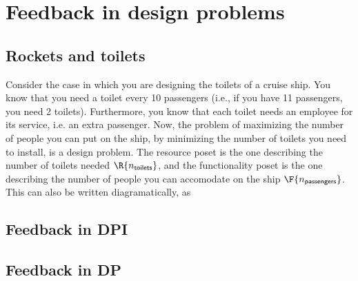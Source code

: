 

\section{Feedback in design problems}
\label{sec:feedbackindesign}

\subsection{Rockets and toilets}

Consider the case in which you are designing the toilets of a cruise ship. You know that you need a toilet every 10 passengers (i.e., if you have 11 passengers, you need 2 toilets). Furthermore, you know that each toilet needs an employee for its service, i.e. an extra passenger. Now, the problem of maximizing the number of people you can put on the ship, by minimizing the number of toilets you need to install, is a design problem. The resource poset is the one describing the number of toilets needed $\R{n_\mathsf{toilets}}$, and the functionality poset is the one describing the number of people you can accomodate on the ship $\F{n_\mathsf{passengers}}$.
This can also be written diagramatically, as
\begin{center}
\end{center}

\subsection{Feedback in DPI}


\subsection{Feedback in DP}


